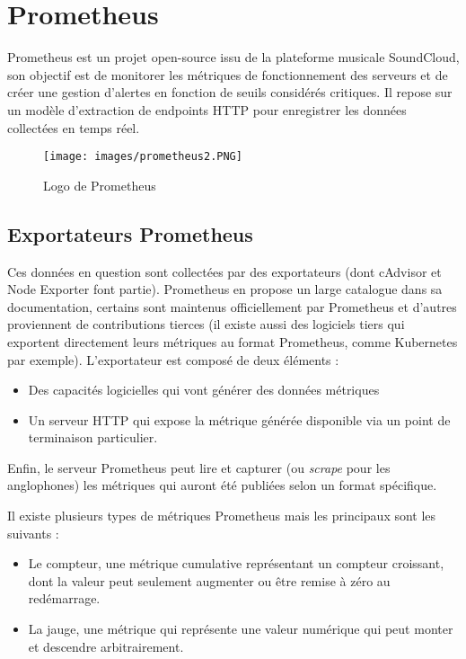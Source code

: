 \documentclass[oneside,12pt]{report}
\begin{document}
\section{Prometheus}

Prometheus est un projet open-source issu de la plateforme musicale SoundCloud, son objectif est de monitorer les métriques de fonctionnement des serveurs et de créer une gestion d'alertes en fonction de seuils considérés critiques. Il repose sur un modèle d'extraction de endpoints HTTP pour enregistrer les données collectées en temps réel. 

\begin{figure}[!ht]
    \centering
    \texttt{[image: images/prometheus2.PNG]}
    \caption{Logo de Prometheus}
    \label{fig:mesh1}
\end{figure}

\subsection{Exportateurs Prometheus}

Ces données en question sont collectées par des exportateurs (dont cAdvisor et Node Exporter font partie). Prometheus en propose un large catalogue dans sa documentation, certains sont maintenus officiellement par Prometheus et d'autres proviennent de contributions tierces (il existe aussi des logiciels tiers qui exportent directement leurs métriques au format Prometheus, comme Kubernetes par exemple). L'exportateur est composé de deux éléments :

\newpage

\begin{itemize}

    \item Des capacités logicielles qui vont générer des données métriques 

    \item Un serveur HTTP qui expose la métrique générée disponible via un point de terminaison particulier.

\end{itemize}

Enfin, le serveur Prometheus peut lire et capturer (ou \emph{scrape} pour les anglophones) les métriques qui auront été publiées selon un format spécifique.\newline

Il existe plusieurs types de métriques Prometheus mais les principaux sont les suivants :

\begin{itemize}

    \item Le compteur, une métrique cumulative représentant un compteur croissant, dont la valeur peut seulement augmenter ou être remise à zéro au redémarrage.
    
    \item La jauge, une métrique qui représente une valeur numérique qui peut monter et descendre arbitrairement.
    
\end{itemize}
\end{document}

